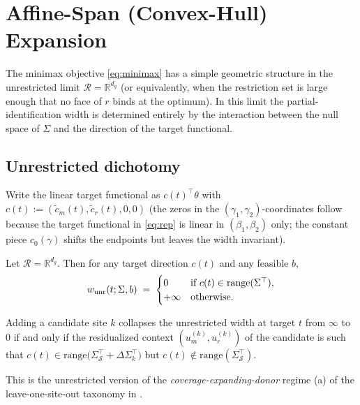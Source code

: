 \section{Affine-Span (Convex-Hull) Expansion}
\label{sec:hull}

The minimax objective \eqref{eq:minimax} has a simple geometric structure in the
unrestricted limit $\mathcal{R} = \mathbb{R}^{d_g}$ (or equivalently, when the
restriction set is large enough that no face of $r$ binds at the optimum). In
this limit the partial-identification width is determined entirely by the
interaction between the null space of $\Sigma$ and the direction of the target
functional.

\subsection{Unrestricted dichotomy}
\label{sec:hull-dichotomy}

Write the linear target functional as $c(t)^\top \theta$ with
$c(t) := (\tilde c_m(t), \tilde c_r(t), 0, 0)$ (the zeros in the
$(\gamma_1, \gamma_2)$-coordinates follow because the target functional in
\eqref{eq:rep} is linear in $(\beta_1, \beta_2)$ only; the constant piece
$c_0(\gamma)$ shifts the endpoints but leaves the width invariant).

\begin{proposition}
\label{prop:dichotomy}
Let $\mathcal{R} = \mathbb{R}^{d_g}$. Then for any target direction $c(t)$ and
any feasible $b$,
\[
w_{\rm unr}(t; \Sigma, b) \;=\;
 \begin{cases}
  0 & \text{if } c(t)\in \mathrm{range}(\Sigma^\top), \\
  +\infty & \text{otherwise.}
 \end{cases}
\]
\end{proposition}

\begin{corollary}
\label{cor:collapse}
Adding a candidate site $k$ collapses the unrestricted width at target $t$ from
$\infty$ to $0$ if and only if the residualized context $(u_m^{(k)}, u_r^{(k)})$
of the candidate is such that
$c(t) \in \mathrm{range}\!\bigl(\Sigma_\mathcal{S}^\top + \Delta\Sigma_k^\top\bigr)$
but $c(t) \notin \mathrm{range}(\Sigma_\mathcal{S}^\top)$.
\end{corollary}

This is the unrestricted version of the \emph{coverage-expanding-donor} regime
(a) of the leave-one-site-out taxonomy in \citet[\S4.4]{boyarsky2026}.

